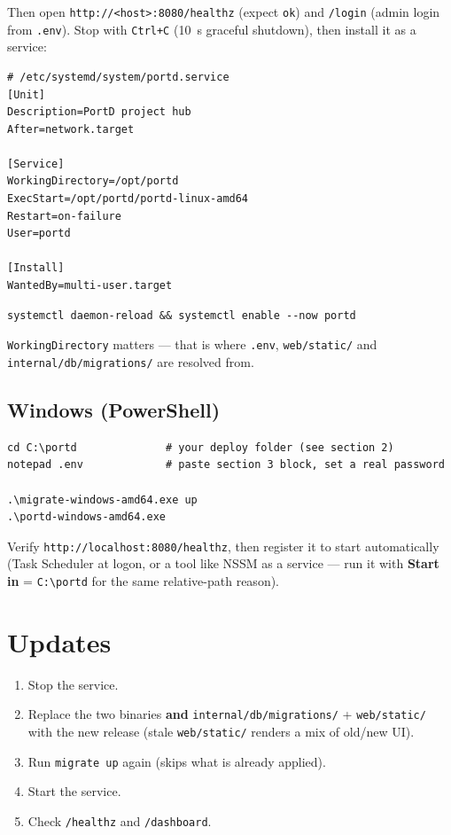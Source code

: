 \documentclass[11pt,a4paper]{article}
\newcommand{\chemin}[1]{\texttt{#1}}
\begin{document}
Then open \chemin{http://<host>:8080/healthz} (expect \chemin{ok}) and \chemin{/login} (admin login from \chemin{.env}). Stop with \chemin{Ctrl+C} (10~s graceful shutdown), then install it as a service:

\begin{verbatim}
# /etc/systemd/system/portd.service
[Unit]
Description=PortD project hub
After=network.target

[Service]
WorkingDirectory=/opt/portd
ExecStart=/opt/portd/portd-linux-amd64
Restart=on-failure
User=portd

[Install]
WantedBy=multi-user.target
\end{verbatim}

\begin{verbatim}
systemctl daemon-reload && systemctl enable --now portd
\end{verbatim}

\chemin{WorkingDirectory} matters — that is where \chemin{.env}, \chemin{web/static/} and \chemin{internal/db/migrations/} are resolved from.

\subsection{Windows (PowerShell)}

\begin{verbatim}
cd C:\portd              # your deploy folder (see section 2)
notepad .env             # paste section 3 block, set a real password

.\migrate-windows-amd64.exe up
.\portd-windows-amd64.exe
\end{verbatim}

Verify \chemin{http://localhost:8080/healthz}, then register it to start automatically (Task Scheduler at logon, or a tool like NSSM as a service — run it with \textbf{Start in} = \chemin{C:\textbackslash portd} for the same relative-path reason).

\section{Updates}

\begin{enumerate}[leftmargin=*]
  \item Stop the service.
  \item Replace the two binaries \textbf{and} \chemin{internal/db/migrations/} + \chemin{web/static/} with the new release (stale \chemin{web/static/} renders a mix of old/new UI).
  \item Run \chemin{migrate up} again (skips what is already applied).
  \item Start the service.
  \item Check \chemin{/healthz} and \chemin{/dashboard}.
\end{enumerate}
\end{document}

